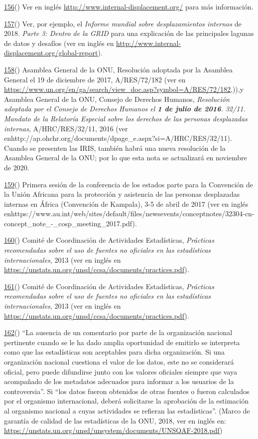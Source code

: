 \documentclass[
]{book}
\begin{document}
\protect\hyperlink{sdfootnote156anc}{156}() Ver en inglés \url{http://www.internal-displacement.org/} para más información.

\protect\hyperlink{sdfootnote157anc}{157}() Ver, por ejemplo, el \emph{Informe mundial sobre desplazamientos internos} de 2018. \emph{Parte 3: Dentro de la GRID} para una explicación de las principales lagunas de datos y desafíos (ver en inglés en \url{http://www.internal-displacement.org/global-report}).

\protect\hyperlink{sdfootnote158anc}{158}() Asamblea General de la ONU, Resolución adoptada por la Asamblea General el 19 de diciembre de 2017, A/RES/72/182 (ver en \url{https://www.un.org/en/ga/search/view_doc.asp?symbol=A/RES/72/182},)),y Asamblea General de la ONU, Consejo de Derechos Humanos, \emph{Resolución adoptada por el Consejo de Derechos Humanos el \textbf{1 de julio de 2016}. 32/11. Mandato de la Relatoría Especial sobre los derechos de las personas desplazadas internas}, A/HRC/RES/32/11, 2016 (ver enhttp://ap.ohchr.org/documents/dpage\_e.aspx?si=A/HRC/RES/32/11). Cuando se presenten las IRIS, también habrá una nueva resolución de la Asamblea General de la ONU; por lo que esta nota se actualizará en noviembre de 2020.

\protect\hyperlink{sdfootnote159anc}{159}() Primera sesión de la conferencia de los estados parte para la Convención de la Unión Africana para la protección y asistencia de las personas desplazadas internas en África (Convención de Kampala), 3-5 de abril de 2017 (ver en inglés enhttps://www.au.int/web/sites/default/files/newsevents/conceptnotes/32304-cn-concept\_note\_-\_cosp\_meeting\_2017.pdf).

\protect\hyperlink{sdfootnote160anc}{160}() Comité de Coordinación de Actividades Estadísticas, \emph{Prácticas recomendadas sobre el uso de fuentes no oficiales en las estadísticas internacionales}, 2013 (ver en inglés en \url{https://unstats.un.org/unsd/ccsa/documents/practices.pdf}).

\protect\hyperlink{sdfootnote161anc}{161}() Comité de Coordinación de Actividades Estadísticas, \emph{Prácticas recomendadas sobre el uso de fuentes no oficiales en las estadísticas internacionales}, 2013 (ver en inglés en \url{https://unstats.un.org/unsd/ccsa/documents/practices.pdf}).

\protect\hyperlink{sdfootnote162anc}{162}() ``La ausencia de un comentario por parte de la organización nacional pertinente cuando se le ha dado amplia oportunidad de emitirlo se interpreta como que las estadísticas son aceptables para dicha organización. Si una organización nacional cuestiona el valor de los datos, este no se considerará oficial, pero puede difundirse junto con los valores oficiales siempre que vaya acompañado de los metadatos adecuados para informar a los usuarios de la controversia''. Si ``los datos fueron obtenidos de otras fuentes o fueron calculados por el organismo internacional, deberá solicitarse la aprobación de la estimación al organismo nacional a cuyas actividades se refieran las estadísticas''. (Marco de garantía de calidad de las estadísticas de la ONU, 2018, ver en inglés en: \url{https://unstats.un.org/unsd/unsystem/documents/UNSQAF-2018.pdf})
\end{document}
